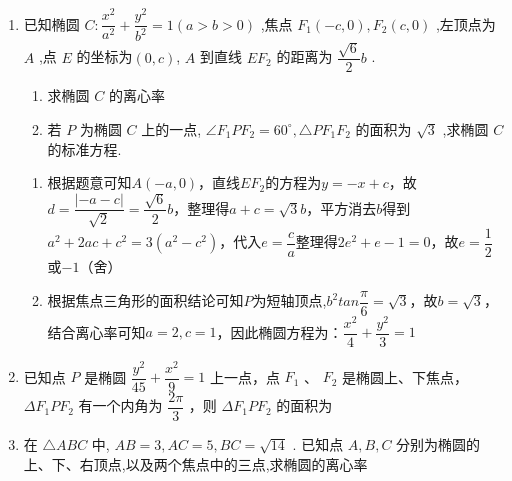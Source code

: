 \begin{enumerate}
\begin{enumerate}
\begin{jieda}
            \ps 直接看出特殊等腰直角三角形更好.
        \end{jieda} 
        \item 已知椭圆 $C : \dfrac{{x}^{2}}{{a}^{2}} + \dfrac{{y}^{2}}{{b}^{2}} = 1\left( {a > b > 0}\right)$ ,焦点 ${F}_{1}\left( {-c,0}\right) ,{F}_{2}\left( {c,0}\right)$ ,左顶点为 $A$ ,点 $E$ 的坐标为$(0,c)$, $A$ 到直线 $E{F}_{2}$ 的距离为 $\dfrac{\sqrt{6}}{2}b$ .
        \begin{enumerate}
            \item 求椭圆 $C$ 的离心率
            \item 若 $P$ 为椭圆 $C$ 上的一点, $\angle {F}_{1}P{F}_{2} = {60}^{ \circ  },\bigtriangleup P{F}_{1}{F}_{2}$ 的面积为 $\sqrt{3}$ ,求椭圆 $C$ 的标准方程.
        \end{enumerate}
        \begin{jieda}
            \begin{enumerate}
                \item 根据题意可知$A(-a, 0)$，直线$EF_2$的方程为$y = -x+c$，故$d = \dfrac{|-a-c|}{\sqrt{2}} = \dfrac{\sqrt{6}}{2}b$，整理得$a+c = \sqrt{3}b$，平方消去$b$得到$a^2+2ac+c^2 = 3(a^2-c^2)$，代入$e = \dfrac{c}{a}$整理得$2e^2+e-1 = 0$，故$e = \dfrac{1}{2}$或$-1$（舍）
                \item 根据焦点三角形的面积结论可知$P$为短轴顶点,$b^2tan\dfrac{\pi}{6} = \sqrt{3}$，故$b = \sqrt{3}$，结合离心率可知$a = 2, c = 1$，因此椭圆方程为：$\dfrac{{x}^{2}}{4} + \dfrac{{y}^{2}}{3} = 1$
            \end{enumerate}
        \end{jieda}

        \item 已知点 $P$ 是椭圆 $\dfrac{y^2}{45} + \dfrac{x^2}{9} = 1$ 上一点，点 $F_1$ 、 $F_2$ 是椭圆上、下焦点， $\Delta F_{1}PF_2$ 有一个内角为 $\dfrac{2\pi}{3}$ ，则 $\Delta F_{1}PF_2$ 的面积为
        
        \item 在 $\bigtriangleup ABC$ 中, $AB = 3,AC = 5,BC = \sqrt{14}$ . 已知点 $A,B,C$ 分别为椭圆的上、下、右顶点,以及两个焦点中的三点,求椭圆的离心率


\end{enumerate}
\end{enumerate}
